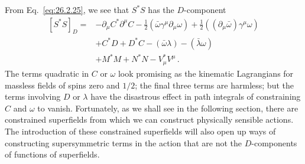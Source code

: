 From Eq.~\eqref{eq:26.2.25}, we see that $S^*S$ has the $D$-component
\begin{equation}
  \begin{aligned}
  [S^*S]_D={}&-\partial_\mu C^*\partial^\mu C
  -\frac12(\bar\omega\gamma^\mu\partial_\mu\omega)
  +\frac12((\partial_\mu\bar\omega)\gamma^\mu\omega)\\
  &+C^*D+D^*C-(\bar\omega\lambda)-(\bar\lambda\omega)\\
  &+M^*M+N^*N-V_\mu^*V^\mu\,.
  \end{aligned}
  \tag{26.2.33}\label{eq:26.2.33}
\end{equation}
The terms quadratic in $C$ or $\omega$ look promising as the kinematic
Lagrangians for massless fields of spins zero and $1/2$; the final three terms
are harmless; but the terms involving $D$ or $\lambda$ have the disastrous
effect in path integrals of constraining $C$ and $\omega$ to vanish.
Fortunately, as we shall see in the following section, there are constrained
superfields from which we can construct physically sensible actions. The
introduction of these constrained superfields will also open up ways of
constructing supersymmetric terms in the action that are not the
$D$-components of functions of superfields.


